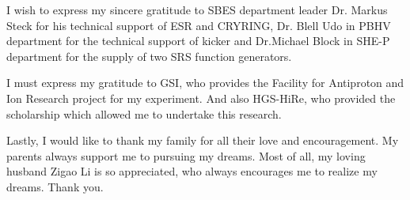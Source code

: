 I wish to express my sincere gratitude to \gls{SBES} department leader Dr. Markus Steck for his technical support of ESR and CRYRING, Dr. Blell Udo in \gls{PBHV} department for the technical support of kicker and Dr.Michael Block in \gls{SHE-P} department for the supply of two SRS function generators. 

I must express my gratitude to GSI, who provides the Facility for Antiproton and Ion Research project for my experiment. And also HGS-HiRe, who provided the scholarship which allowed me to undertake this research.


Lastly, I would like to thank my family for all their love and encouragement. My parents always support me to pursuing my dreams. Most of all, my loving husband Zigao Li is so appreciated, who always encourages me to realize my dreams. Thank you.




